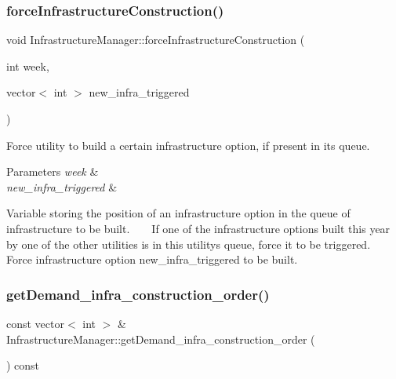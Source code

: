 \mbox{\label{classInfrastructureManager_aaa79bdb84fc23597c4a8b3776dc26f5d_aaa79bdb84fc23597c4a8b3776dc26f5d}} 
\subsubsection{\texorpdfstring{force\+Infrastructure\+Construction()}{forceInfrastructureConstruction()}}
{\footnotesize\ttfamily void Infrastructure\+Manager\+::force\+Infrastructure\+Construction (\begin{DoxyParamCaption}\item[{int}]{week,  }\item[{vector$<$ int $>$}]{new\+\_\+infra\+\_\+triggered }\end{DoxyParamCaption})}

Force utility to build a certain infrastructure option, if present in its queue. 
\begin{DoxyParams}{Parameters}
{\em week} & \\
\hline
{\em new\+\_\+infra\+\_\+triggered} & \\
\hline
\end{DoxyParams}
Variable storing the position of an infrastructure option in the queue of infrastructure to be built. ~\newline
~\newline
 If one of the infrastructure options built this year by one of the other utilities is in this utility\textquotesingle{}s queue, force it to be triggered. ~\newline
 Force infrastructure option new\+\_\+infra\+\_\+triggered to be built. \mbox{\label{classInfrastructureManager_a5766b6aa0d40f316a6ef57df2dcfa198_a5766b6aa0d40f316a6ef57df2dcfa198}} 
\subsubsection{\texorpdfstring{get\+Demand\+\_\+infra\+\_\+construction\+\_\+order()}{getDemand\_infra\_construction\_order()}}
{\footnotesize\ttfamily const vector$<$ int $>$ \& Infrastructure\+Manager\+::get\+Demand\+\_\+infra\+\_\+construction\+\_\+order (\begin{DoxyParamCaption}{ }\end{DoxyParamCaption}) const}

